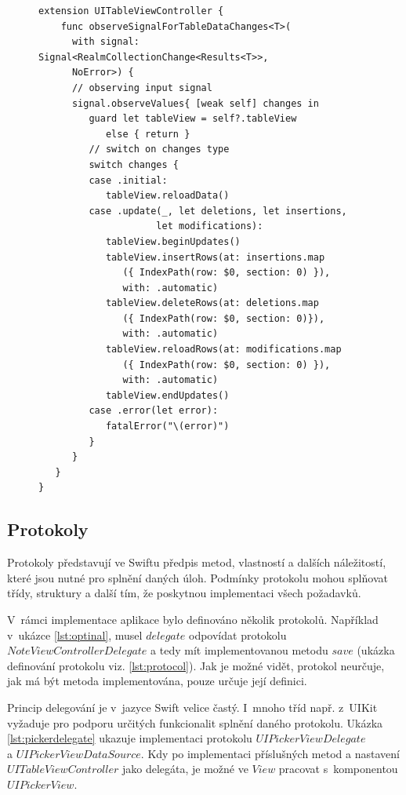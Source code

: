 \documentclass[thesis=M,czech]{FITthesis}[2012/06/26]
\begin{document}
\begin{figure}
\begin{minipage}{\linewidth}
\begin{lstlisting}[caption={Ukázka Extension},label={lst:extension}]
extension UITableViewController {
    func observeSignalForTableDataChanges<T>(
      with signal: Signal<RealmCollectionChange<Results<T>>,
      NoError>) {
      // observing input signal
      signal.observeValues{ [weak self] changes in
         guard let tableView = self?.tableView
            else { return }
         // switch on changes type   
         switch changes {
         case .initial:
            tableView.reloadData()
         case .update(_, let deletions, let insertions,
                     let modifications):
            tableView.beginUpdates()
            tableView.insertRows(at: insertions.map
               ({ IndexPath(row: $0, section: 0) }),
               with: .automatic)
            tableView.deleteRows(at: deletions.map
               ({ IndexPath(row: $0, section: 0)}),
               with: .automatic)
            tableView.reloadRows(at: modifications.map
               ({ IndexPath(row: $0, section: 0) }),
               with: .automatic)
            tableView.endUpdates()
         case .error(let error):
            fatalError("\(error)")
         }
      }
   }
}
\end{lstlisting}
\end{minipage}
\end{figure}
	
\subsection{Protokoly}
Protokoly představují ve Swiftu předpis metod, vlastností a dalších náležitostí, které jsou nutné pro splnění daných úloh. Podmínky protokolu mohou splňovat třídy, struktury a další tím, že poskytnou implementaci všech požadavků. \cite{devProtocol}

V~rámci implementace aplikace bylo definováno několik protokolů. Například v~ukázce \ref{lst:optinal}, musel $delegate$ odpovídat protokolu\\ $NoteViewControllerDelegate$ a tedy mít implementovanou metodu $save$ (ukázka definování protokolu viz. \ref{lst:protocol}). Jak je možné vidět, protokol neurčuje, jak má být metoda implementována, pouze určuje její definici.

Princip delegování je v~jazyce Swift velice častý. I~mnoho tříd např. z~UIKit vyžaduje pro podporu určitých funkcionalit splnění daného protokolu. Ukázka \ref{lst:pickerdelegate} ukazuje implementaci protokolu $UIPickerViewDelegate$\\ a $UIPickerViewDataSource$. Kdy po implementaci příslušných metod a nastavení $UITableViewController$ jako delegáta, je možné ve $View$ pracovat s~komponentou $UIPickerView$.
	
\end{document}
